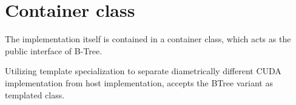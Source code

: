 \section{Container class}

The implementation itself is contained in a container class, which acts as the public interface of B-Tree. 

Utilizing template specialization to separate diametrically different CUDA implementation from host implementation, accepts the BTree variant as templated class. 
